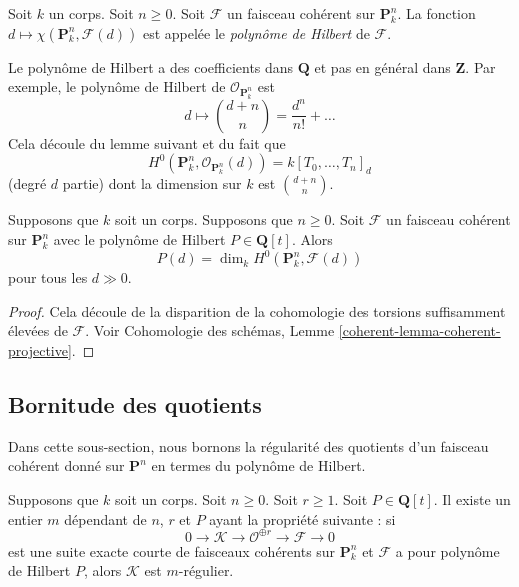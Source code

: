 \begin{definition}
\label{definition-hilbert-polynomial}
Soit $k$ un corps. Soit $n \geq 0$. Soit $\mathcal{F}$
un faisceau cohérent sur $\mathbf{P}^n_k$. La fonction
$d \mapsto \chi(\mathbf{P}^n_k, \mathcal{F}(d))$ est
appelée le {\it polynôme de Hilbert } de $\mathcal{F}$.
\end{definition}

\noindent
Le polynôme de Hilbert a des coefficients dans
$\mathbf{Q}$ et pas en général dans $\mathbf{Z}$. Par exemple,
le polynôme de Hilbert de $\mathcal{O}_{\mathbf{P}^n_k}$ est
$$
d \longmapsto {d + n \choose n} = \frac{d^n}{n!} + \ldots
$$
Cela découle du lemme suivant et du fait que
$$
H^0(\mathbf{P}^n_k, \mathcal{O}_{\mathbf{P}^n_k}(d)) = k[T_0, \ldots, T_n]_d
$$
(degré $d$ partie) dont la dimension sur $k$ est ${d + n \choose n}$.

\begin{lemma}
\label{lemma-hilbert-polynomial-H0}
Supposons que $k$ soit un corps. Supposons que $n \geq 0$.
Soit $\mathcal{F}$ un faisceau cohérent sur
$\mathbf{P}^n_k$ avec le polynôme de Hilbert $P \in \mathbf{Q}[t]$. Alors
$$
P(d) = \dim_k H^0(\mathbf{P}^n_k, \mathcal{F}(d))
$$
pour tous les $d \gg 0$.
\end{lemma}

\begin{proof}
Cela découle de la disparition de la
cohomologie des torsions suffisamment élevées
de $\mathcal{F}$. Voir Cohomologie des schémas,
Lemme \ref{coherent-lemma-coherent-projective}.
\end{proof}



\subsection{Bornitude des quotients}
\label{subsection-boundedness}

\noindent
Dans cette sous-section, nous bornons la
régularité des quotients d'un faisceau cohérent donné
sur $\mathbf{P}^n$ en termes du polynôme de Hilbert.

\begin{lemma}
\label{lemma-bound-quotients-free}
Supposons que $k$ soit un corps. Soit $n \geq 0$. Soit $r
\geq 1$. Soit $P \in \mathbf{Q}[t]$. Il existe un entier $m$
dépendant de $n$, $r$ et $P$ ayant la propriété suivante : si
$$
0 \to \mathcal{K} \to \mathcal{O}^{\oplus r} \to \mathcal{F} \to 0
$$
est une suite exacte courte de faisceaux cohérents
sur $\mathbf{P}^n_k$ et $\mathcal{F}$ a pour polynôme
de Hilbert $P$, alors $\mathcal{K}$ est $m$-régulier.
\end{lemma}

